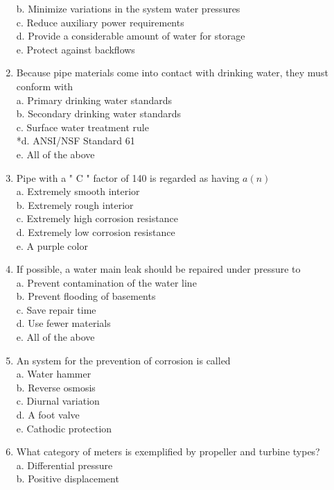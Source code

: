 \begin{enumerate}[1.]
b. Minimize variations in the system water pressures\\
c. Reduce auxiliary power requirements\\
d. Provide a considerable amount of water for storage\\
e. Protect against backflows\\
\item Because pipe materials come into contact with drinking water, they must conform with\\
a. Primary drinking water standards\\
b. Secondary drinking water standards\\
c. Surface water treatment rule\\
*d. ANSI/NSF Standard 61\\
e. All of the above\\
\item Pipe with a " C " factor of 140 is regarded as having $a(n)$\\
a. Extremely smooth interior\\
b. Extremely rough interior\\
c. Extremely high corrosion resistance\\
d. Extremely low corrosion resistance\\
e. A purple color\\
\item If possible, a water main leak should be repaired under pressure to\\
a. Prevent contamination of the water line\\
b. Prevent flooding of basements\\
c. Save repair time\\
d. Use fewer materials\\
e. All of the above\\
\item An system for the prevention of corrosion is called\\
a. Water hammer\\
b. Reverse osmosis\\
c. Diurnal variation\\
d. A foot valve\\
e. Cathodic protection\\
\item What category of meters is exemplified by propeller and turbine types?\\
a. Differential pressure\\
b. Positive displacement\\

\end{enumerate}
